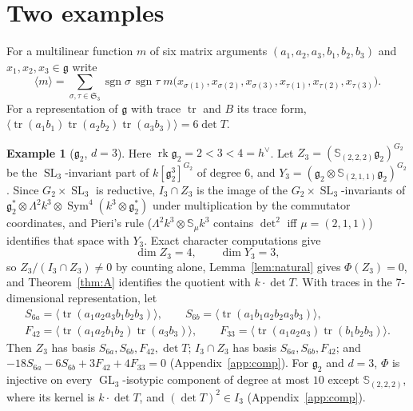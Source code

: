\documentclass[11pt]{article}
\theoremstyle{definition}
\newtheorem{exampleblock}[theorem]{Example}
\newcommand{\g}{\mathfrak g}
\newcommand{\rk}{\operatorname{rk}}
\newcommand{\Sf}{\mathbb S}
\newcommand{\hv}{h^\vee}
\newcommand{\Sg}{\mathfrak S}
\DeclareMathOperator{\Sym}{Sym}
\DeclareMathOperator{\GL}{GL}
\DeclareMathOperator{\SL}{SL}
\DeclareMathOperator{\sgn}{sgn}
\begin{document}
\section{Two examples}\label{sec:examples}

For a multilinear function $m$ of six matrix arguments $(a_1,a_2,a_3,b_1,b_2,b_3)$ and $x_1,x_2,x_3\in\g$ write
\[
\langle m\rangle=\sum_{\sigma,\tau\in\Sg_3}\sgn\sigma\,\sgn\tau\;m\bigl(x_{\sigma(1)},x_{\sigma(2)},x_{\sigma(3)},x_{\tau(1)},x_{\tau(2)},x_{\tau(3)}\bigr).
\]
For a representation of $\g$ with trace $\operatorname{tr}$ and $B$ its trace form, $\langle\operatorname{tr}(a_1b_1)\operatorname{tr}(a_2b_2)\operatorname{tr}(a_3b_3)\rangle=6\det T$.

\begin{exampleblock}[$\g_2$, $d=3$]\label{ex:g2}
Here $\rk\g_2=2<3<4=\hv$. Let $Z_3=(\Sf_{(2,2,2)}\g_2)^{G_2}$ be the $\SL_3$-invariant part of $k[\g_2^3]^{G_2}$ of degree $6$, and $Y_3=(\g_2\otimes\Sf_{(2,1,1)}\g_2)^{G_2}$. Since $G_2\times\SL_3$ is reductive, $I_3\cap Z_3$ is the image of the $G_2\times\SL_3$-invariants of $\g_2^*\otimes\Lambda^2k^3\otimes\Sym^4(k^3\otimes\g_2^*)$ under multiplication by the commutator coordinates, and Pieri's rule ($\Lambda^2k^3\otimes\Sf_\mu k^3$ contains $\det^2$ iff $\mu=(2,1,1)$) identifies that space with $Y_3$. Exact character computations give
\[
\dim Z_3=4,\qquad \dim Y_3=3 ,
\]
so $Z_3/(I_3\cap Z_3)\neq0$ by counting alone, Lemma~\ref{lem:natural} gives $\Phi(Z_3)=0$, and Theorem~\ref{thm:A} identifies the quotient with $k\cdot\det T$. With traces in the $7$-dimensional representation, let
\begin{gather*}
S_{6a}=\langle\operatorname{tr}(a_1a_2a_3b_1b_2b_3)\rangle,\qquad S_{6b}=\langle\operatorname{tr}(a_1b_1a_2b_2a_3b_3)\rangle,\\
F_{42}=\langle\operatorname{tr}(a_1a_2b_1b_2)\operatorname{tr}(a_3b_3)\rangle,\qquad F_{33}=\langle\operatorname{tr}(a_1a_2a_3)\operatorname{tr}(b_1b_2b_3)\rangle .
\end{gather*}
Then $Z_3$ has basis $S_{6a},S_{6b},F_{42},\det T$; $I_3\cap Z_3$ has basis $S_{6a},S_{6b},F_{42}$; and $-18S_{6a}-6S_{6b}+3F_{42}+4F_{33}=0$ (Appendix~\ref{app:comp}). For $\g_2$ and $d=3$, $\Phi$ is injective on every $\GL_3$-isotypic component of degree at most $10$ except $\Sf_{(2,2,2)}$, where its kernel is $k\cdot\det T$, and $(\det T)^2\in I_3$ (Appendix~\ref{app:comp}).


\end{exampleblock}
\end{document}
